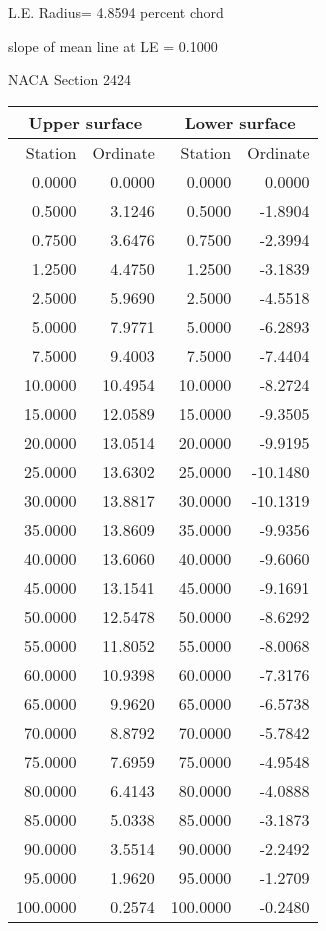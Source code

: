 \documentclass[11pt]{book}
\begin{document}
L.E. Radius=  4.8594 percent chord


 slope of mean line at LE =  0.1000
 \newpage
  \label{s2424}
 \begin{Large}
 NACA Section 2424
 \end{Large}
  
 \vspace{8mm}
 \begin{tabular}{|r|r|r|r|} \hline 
 \multicolumn{2}{|c|}{Upper surface} & \multicolumn{2}{|c|}{Lower surface} \\
 \hline
 Station & Ordinate & Station & Ordinate \\
 \hline
0.0000 & 0.0000 & 0.0000 & 0.0000 \\
0.5000 & 3.1246 & 0.5000 & -1.8904 \\
0.7500 & 3.6476 & 0.7500 & -2.3994 \\
1.2500 & 4.4750 & 1.2500 & -3.1839 \\
2.5000 & 5.9690 & 2.5000 & -4.5518 \\
5.0000 & 7.9771 & 5.0000 & -6.2893 \\
7.5000 & 9.4003 & 7.5000 & -7.4404 \\
10.0000 & 10.4954 & 10.0000 & -8.2724 \\
15.0000 & 12.0589 & 15.0000 & -9.3505 \\
20.0000 & 13.0514 & 20.0000 & -9.9195 \\
25.0000 & 13.6302 & 25.0000 & -10.1480 \\
30.0000 & 13.8817 & 30.0000 & -10.1319 \\
35.0000 & 13.8609 & 35.0000 & -9.9356 \\
40.0000 & 13.6060 & 40.0000 & -9.6060 \\
45.0000 & 13.1541 & 45.0000 & -9.1691 \\
50.0000 & 12.5478 & 50.0000 & -8.6292 \\
55.0000 & 11.8052 & 55.0000 & -8.0068 \\
60.0000 & 10.9398 & 60.0000 & -7.3176 \\
65.0000 & 9.9620 & 65.0000 & -6.5738 \\
70.0000 & 8.8792 & 70.0000 & -5.7842 \\
75.0000 & 7.6959 & 75.0000 & -4.9548 \\
80.0000 & 6.4143 & 80.0000 & -4.0888 \\
85.0000 & 5.0338 & 85.0000 & -3.1873 \\
90.0000 & 3.5514 & 90.0000 & -2.2492 \\
95.0000 & 1.9620 & 95.0000 & -1.2709 \\
100.0000 & 0.2574 & 100.0000 & -0.2480 \\
 \hline 
 \end{tabular}
\end{document}

